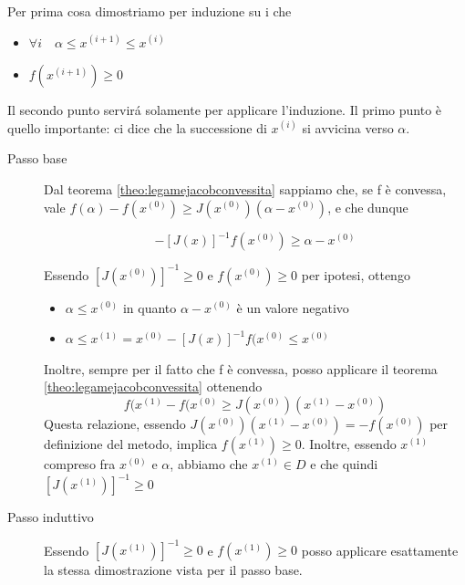 \begin{thproof}
Per prima cosa dimostriamo per induzione su i che
\begin{itemize}
\item $ \forall i \quad \alpha \leq x^{(i+1)} \leq x^{(i)} $
\item $ f(x^{(i+1)}) \geq 0 $
\end{itemize}
Il secondo punto servir\'a solamente per applicare l'induzione. Il primo punto \`e  quello importante: ci dice che la successione di $ x^{(i)} $ si avvicina verso $ \alpha $.

\begin{description}
\item[Passo base] Dal teorema \ref{theo:legamejacobconvessita} sappiamo che, se f \`e  convessa, vale $ f(\alpha) - f(x^{(0)}) \geq J(x^{(0)})(\alpha - x^{(0)}) $, e che dunque

\begin{equation}
-[J(x)]^{-1}f(x^{(0)}) \geq \alpha - x^{(0)}
\label{eqn:nrfunzconv}
\end{equation}

Essendo $ [J(x^{(0)})]^{-1} \geq 0 $ e $ f(x^{(0)}) \geq 0 $ per ipotesi, ottengo

\begin{itemize}
\item $ \alpha \leq x^{(0)} $ in quanto $ \alpha - x^{(0)} $ \`e  un valore negativo
\item $ \alpha \leq x^{(1)} = x^{(0)}-[J(x)]^{-1}f(x^{(0)} \leq x^{(0)} $
\end{itemize}

Inoltre, sempre per il fatto che f \`e  convessa, posso applicare il teorema \ref{theo:legamejacobconvessita} ottenendo
\[ f(x^{(1)} - f(x^{(0)} \geq J(x^{(0)})(x^{(1)} - x^{(0)}) \]
Questa relazione, essendo $ J(x^{(0)})(x^{(1)} - x^{(0)}) = -f(x^{(0)}) $ per definizione del metodo, implica $ f(x^{(1)}) \geq 0 $. Inoltre, essendo $ x^{(1)} $ compreso fra $ x^{(0)} $ e $ \alpha $, abbiamo che $ x^{(1)} \in D $ e che quindi $ [J(x^{(1)})]^{-1} \geq 0 $

\item[Passo induttivo] Essendo $ [J(x^{(1)})]^{-1} \geq 0 $ e $ f(x^{(1)}) \geq 0 $ posso applicare esattamente la stessa dimostrazione vista per il passo base.
\end{description}


\end{thproof}
